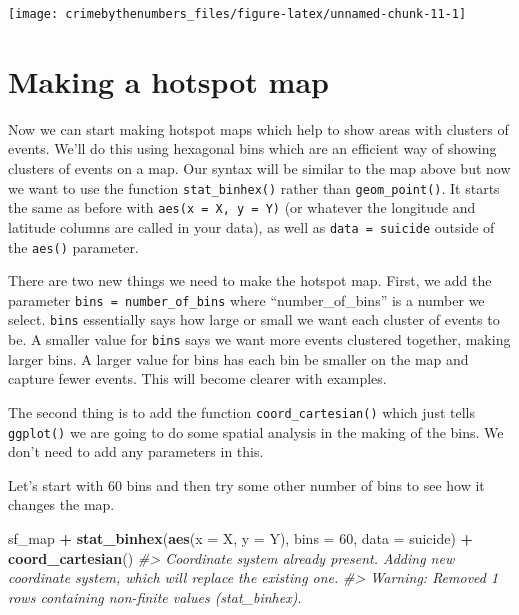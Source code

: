 \documentclass[
  12pt,
]{book}
\newenvironment{Shaded}{\begin{snugshade}}{\end{snugshade}}
\newcommand{\CommentTok}[1]{\textcolor[rgb]{0.37,0.37,0.37}{\textit{#1}}}
\newcommand{\DataTypeTok}[1]{\textcolor[rgb]{0.27,0.27,0.27}{#1}}
\newcommand{\DecValTok}[1]{\textcolor[rgb]{0.06,0.06,0.06}{#1}}
\newcommand{\KeywordTok}[1]{\textcolor[rgb]{0.27,0.27,0.27}{\textbf{#1}}}
\newcommand{\NormalTok}[1]{#1}
\newcommand{\OperatorTok}[1]{\textcolor[rgb]{0.43,0.43,0.43}{\textbf{#1}}}
\newcommand{\StringTok}[1]{\textcolor[rgb]{0.5,0.5,0.5}{#1}}
\begin{document}
\begin{Shaded}
\end{Shaded}

\begin{center}\texttt{[image: crimebythenumbers\_files/figure-latex/unnamed-chunk-11-1]} \end{center}

\hypertarget{making-a-hotspot-map}{%
\section{Making a hotspot map}\label{making-a-hotspot-map}}

Now we can start making hotspot maps which help to show areas with clusters of events. We'll do this using hexagonal bins which are an efficient way of showing clusters of events on a map. Our syntax will be similar to the map above but now we want to use the function \texttt{stat\_binhex()} rather than \texttt{geom\_point()}. It starts the same as before with \texttt{aes(x\ =\ X,\ y\ =\ Y)} (or whatever the longitude and latitude columns are called in your data), as well as \texttt{data\ =\ suicide} outside of the \texttt{aes()} parameter.

There are two new things we need to make the hotspot map. First, we add the parameter \texttt{bins\ =\ number\_of\_bins} where ``number\_of\_bins'' is a number we select. \texttt{bins} essentially says how large or small we want each cluster of events to be. A smaller value for \texttt{bins} says we want more events clustered together, making larger bins. A larger value for bins has each bin be smaller on the map and capture fewer events. This will become clearer with examples.

The second thing is to add the function \texttt{coord\_cartesian()} which just tells \texttt{ggplot()} we are going to do some spatial analysis in the making of the bins. We don't need to add any parameters in this.

Let's start with 60 bins and then try some other number of bins to see how it changes the map.

\begin{Shaded}
\begin{Highlighting}[]
\NormalTok{sf\_map }\OperatorTok{+}
\StringTok{  }\KeywordTok{stat\_binhex}\NormalTok{(}\KeywordTok{aes}\NormalTok{(}\DataTypeTok{x =}\NormalTok{ X, }\DataTypeTok{y =}\NormalTok{ Y),}
              \DataTypeTok{bins =} \DecValTok{60}\NormalTok{,}
              \DataTypeTok{data =}\NormalTok{ suicide) }\OperatorTok{+}
\StringTok{  }\KeywordTok{coord\_cartesian}\NormalTok{() }
\CommentTok{\#> Coordinate system already present. Adding new coordinate system, which will replace the existing one.}
\CommentTok{\#> Warning: Removed 1 rows containing non{-}finite values (stat\_binhex).}
\end{Highlighting}
\end{Shaded}
\end{document}
